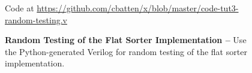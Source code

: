 
\begin{figure}

  

  \centerline{\small Code at
    \url{https://github.com/cbatten/x/blob/master/code-tut3-random-testing.v}}

  \caption{\textbf{Random Testing of the Flat Sorter Implementation --}
    Use the Python-generated Verilog for random testing of the flat
    sorter implementation.}
  \label{code-tut3-random-testing}

\end{figure}

